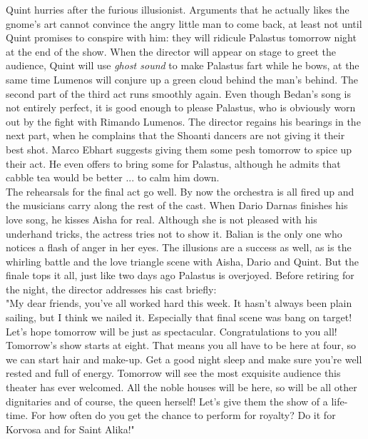 Quint hurries after the furious illusionist. Arguments that he actually likes the gnome's art cannot convince the angry little man to come back, at least not until Quint promises to conspire with him: they will ridicule Palastus tomorrow night at the end of the show. When the director will appear on stage to greet the audience, Quint will use {\itshape ghost sound} to make Palastus fart while he bows, at the same time Lumenos will conjure up a green cloud behind the man's behind. The second part of the third act runs smoothly again. Even though Bedan's song is not entirely perfect, it is good enough to please Palastus, who is obviously worn out by the fight with Rimando Lumenos. The director regains his bearings in the next part, when he complains that the Shoanti dancers are not giving it their best shot. Marco Ebhart suggests giving them some pesh tomorrow to spice up their act. He even offers to bring some for Palastus, although he admits that cabble tea would be better ... to calm him down.\\

The rehearsals for the final act go well. By now the orchestra is all fired up and the musicians carry along the rest of the cast. When Dario Darnas finishes his love song, he kisses Aisha for real. Although she is not pleased with his underhand tricks, the actress tries not to show it. Balian is the only one who notices a flash of anger in her eyes. The illusions are a success as well, as is the whirling battle and the love triangle scene with Aisha, Dario and Quint. But the finale tops it all, just like two days ago Palastus is overjoyed. Before retiring for the night, the director addresses his cast briefly:\\

"My dear friends, you've all worked hard this week. It hasn't always been plain sailing, but I think we nailed it. Especially that final scene was bang on target! Let's hope tomorrow will be just as spectacular. Congratulations to you all!\\

Tomorrow's show starts at eight. That means you all have to be here at four, so we can start hair and make-up. Get a good night sleep and make sure you're well rested and full of energy. Tomorrow will see the most exquisite audience this theater has ever welcomed. All the noble houses will be here, so will be all other dignitaries and of course, the queen herself! Let's give them the show of a life-time. For how often do you get the chance to perform for royalty? Do it for Korvosa and for Saint Alika!"\\


